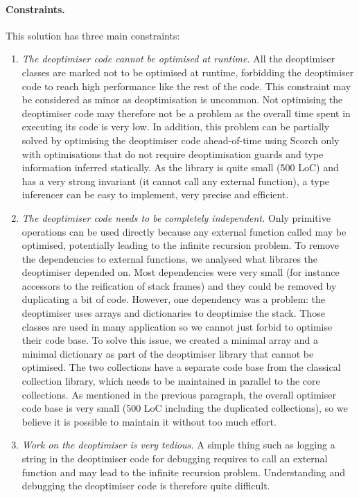 \documentclass[a4paper,12pt,twoside]{../includes/ThesisStyle}
\begin{document}
\paragraph{Constraints.} This solution has three main constraints:
\begin{enumerate}
	\item \emph{The deoptimiser code cannot be optimised at runtime.} All the deoptimiser classes are marked not to be optimised at runtime, forbidding the deoptimiser code to reach high performance like the rest of the code. This constraint may be considered as minor as deoptimisation is uncommon. Not optimising the deoptimiser code may therefore not be a problem as the overall time spent in executing its code is very low. In addition, this problem can be partially solved by optimising the deoptimiser code ahead-of-time using Scorch only with optimisations that do not require deoptimisation guards and type information inferred statically. As the library is quite small (500 LoC) and has a very strong invariant (it cannot call any external function), a type inferencer can be easy to implement, very precise and efficient.
	\item \emph{The deoptimiser code needs to be completely independent.} Only primitive operations can be used directly because any external function called may be optimised, potentially leading to the infinite recursion problem. To remove the dependencies to external functions, we analysed what librares the deoptimiser depended on. Most dependencies were very small (for instance accessors to the reification of stack frames) and they could be removed by duplicating a bit of code. However, one dependency was a problem: the deoptimiser uses arrays and dictionaries to deoptimise the stack. Those classes are used in many application so we cannot just forbid to optimise their code base. To solve this issue, we created a minimal array and a minimal dictionary as part of the deoptimiser library that cannot be optimised. The two collections have a separate code base from the classical collection library, which needs to be maintained in parallel to the core collections. As mentioned in the previous paragraph, the overall optimiser code base is very small (500 LoC including the duplicated collections), so we believe it is possible to maintain it without too much effort.
	\item \emph{Work on the deoptimiser is very tedious.} A simple thing such as logging a string in the deoptimiser code for debugging requires to call an external function and may lead to the infinite recursion problem. Understanding and debugging the deoptimiser code is therefore quite difficult.
\end{enumerate}
\end{document}
